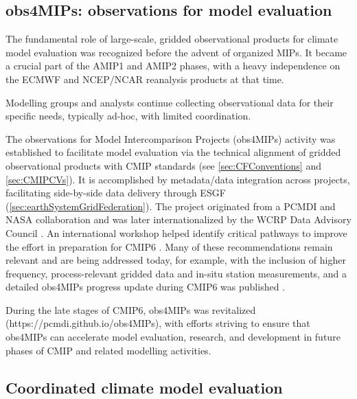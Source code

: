 \documentclass[manuscript]{copernicus}
\begin{document}
\subsection{obs4MIPs: observations for model evaluation}
\label{sec:CMIP6SupportingProjects-obs4MIPs}

The fundamental role of large-scale, gridded observational products for climate model evaluation was recognized before the advent of organized MIPs. It became a crucial part of the AMIP1 \citep{gates_amip_1992} and AMIP2 \citep{gleckler_amip_1996-1} phases, with a heavy independence on the ECMWF and NCEP/NCAR reanalysis products at that time.

Modelling groups and analysts continue collecting observational data for their specific needs, typically ad-hoc, with limited coordination.

The observations for Model Intercomparison Projects (obs4MIPs) activity was established to facilitate model evaluation via the technical alignment of gridded observational products with CMIP standards (see \autoref{sec:CFConventions} and \autoref{sec:CMIPCVs}). It is accomplished by metadata/data integration across projects, facilitating side-by-side data delivery through ESGF (\autoref{sec:earthSystemGridFederation}). The project originated from a PCMDI and NASA collaboration \citep{gleckler_improving_2011} and was later internationalized by the WCRP Data Advisory Council \citep[WDAC;][]{teixeira_satellite_2014}. An international workshop helped identify critical pathways to improve the effort in preparation for CMIP6 \citep{ferraro_evolving_2015}. Many of these recommendations remain relevant and are being addressed today, for example, with the inclusion of higher frequency, process-relevant gridded data and in-situ station measurements, and a detailed obs4MIPs progress update during CMIP6 was published \citep{waliser_observations_2020}.

During the late stages of CMIP6, obs4MIPs was revitalized (https://pcmdi.github.io/obs4MIPs), with efforts striving to ensure that obs4MIPs can accelerate model evaluation, research, and development in future phases of CMIP and related modelling activities. 


\subsection{Coordinated climate model evaluation}
\label{sec:CMIP6SupportingProjects-CoordEval}
\end{document}
